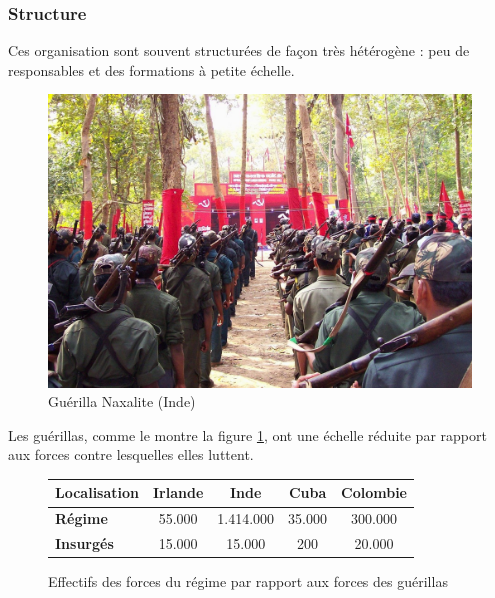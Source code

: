 \documentclass{article}
\begin{document}
\subsubsection{Structure}
Ces organisation sont souvent structurées de façon très hétérogène : peu de responsables et des formations à petite échelle.
\begin{figure}[H]
	\begin{centering}
	\includegraphics[width=\linewidth]{../ressources/guerrilla_naxalite}
	\caption{Guérilla Naxalite (Inde) \cite{guerrilla_naxalite}}
	\end{centering}
\end{figure}

Les guérillas, comme le montre la figure \ref{tab_guerrilla}, ont une échelle réduite par rapport aux forces contre lesquelles elles luttent.
\begin{figure}[H]
	\begin{centering}
	\begin{tabular}{| l | c | c | c | c |}
	\hline
	\textbf{Localisation}		& \textbf{Irlande} 	& \textbf{Inde} 	& \textbf{Cuba}	& \textbf{Colombie}	\\
	\hline
	\textbf{Régime}			& 55.000			& 1.414.000	& 35.000		& 300.000			\\
	\textbf{Insurgés}		& 15.000			& 15.000		& 200		& 20.000			\\
	\hline
	\end{tabular}
	\caption{Effectifs des forces du régime par rapport aux forces des guérillas \cite{naxalite_guerrilla_wiki, irish_civil_war_wiki}}
	\label{tab_guerrilla}
	\end{centering}
\end{figure}
\end{document}
